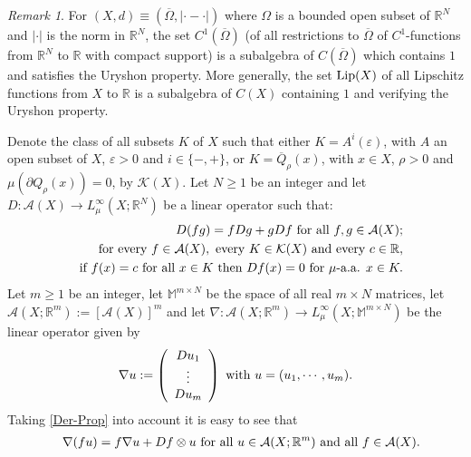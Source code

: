 \documentclass[10pt]{amsart}
\numberwithin{equation}{section}
\theoremstyle{definition}
\theoremstyle{remark}
\newtheorem{remark}[theorem]{Remark}
\begin{document}
\begin{remark}\label{ReMaRk-ExaMpLEs}
For $(X,d)\equiv(\overline{\Omega},|\cdot-\cdot|)$ where $\Omega$ is a bounded open subset of ${{\mathbb R}}^N$ and $|\cdot|$ is the norm in ${{\mathbb R}}^N$, the set $C^1(\overline{\Omega})$ (of all  restrictions to $\overline{\Omega}$ of $C^1$-functions from ${{\mathbb R}}^N$ to ${{\mathbb R}}$ with compact support) is a subalgebra of $C(\overline{\Omega})$ which contains $1$ and satisfies the Uryshon property. More generally, the set ${\rm Lip}(X)$ of all Lipschitz functions from $X$ to ${{\mathbb R}}$ is a subalgebra of $C(X)$ containing $1$ and verifying the Uryshon property.
\end{remark}

Denote the class of all subsets $K$ of $X$ such that either $K=A^i({\varepsilon})$, with $A$ an open subset of $X$, ${\varepsilon}>0$ and $i\in\{-,+\}$, or $K=\overline{Q}_\rho(x)$, with $x\in X$, $\rho>0$ and $\mu(\partial Q_\rho(x))=0$, by $\mathcal{K}(X)$. Let $N\geq 1$ be an integer and let $D:\mathcal{A}(X)\to L_\mu^\infty(X;{{\mathbb R}}^N)$ be a linear operator such that:
\begin{eqnarray}
&&D(fg)=fDg+gDf\hbox{ for all }f,g\in\mathcal{A}(X);\label{Der-Prop}\\
&&\hbox{for every }f\in\mathcal{A}(X),\hbox{ every }K\in \mathcal{K}(X)\hbox{ and every }c\in{{\mathbb R}},\label{Der-Prop-1}\\ &&\hbox{if }f(x)=c\hbox{ for all }x\in K\hbox{ then }Df(x)=0\hbox{ for }\mu\hbox{-a.a. } x\in K.\nonumber
\end{eqnarray}
Let $m\geq 1$ be an integer, let ${{\mathbb M}^{m\times N}}$ be the space of all real $m\times N$ matrices, let $\mathcal{A}(X;{{\mathbb R}}^m):=[\mathcal{A}(X)]^m$ and let $\nabla:\mathcal{A}(X;{{\mathbb R}}^m)\to L^\infty_\mu(X;{{\mathbb M}^{m\times N}})$ be the linear operator given by
\begin{equation}\label{vectorial-D}
\nabla u:=\left(
\begin{array}{c}
Du_1\\
\vdots\\ 
Du_m
\end{array}
\right)
\hbox{ with }u=(u_1,\cdots,u_m).
\end{equation}
Taking \eqref{Der-Prop}  into account it is easy to see that 
\begin{eqnarray}
&&\nabla (f u)=f\nabla u+D f\otimes u\hbox{ for all }u\in\mathcal{A}(X;{{\mathbb R}}^m)\hbox{ and all }f\in\mathcal{A}(X).\label{Gradient-Property}
\end{eqnarray}
\end{document}

